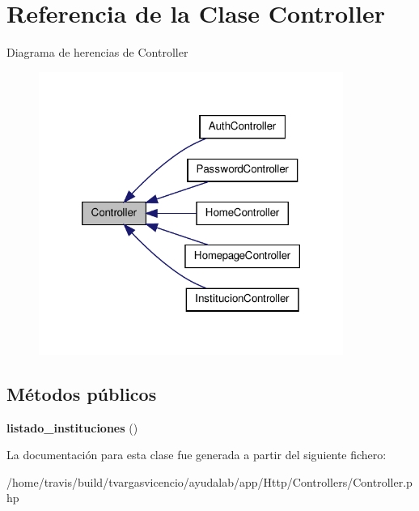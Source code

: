 \hypertarget{class_app_1_1_http_1_1_controllers_1_1_controller}{\section{\-Referencia de la \-Clase \-Controller}
\label{class_app_1_1_http_1_1_controllers_1_1_controller}
}


\-Diagrama de herencias de \-Controller
\nopagebreak
\begin{figure}[H]
\begin{center}
\leavevmode
\includegraphics[width=282pt]{class_app_1_1_http_1_1_controllers_1_1_controller__inherit__graph}
\end{center}
\end{figure}
\subsection*{\-Métodos públicos}
\begin{DoxyCompactItemize}
\item 
\hypertarget{class_app_1_1_http_1_1_controllers_1_1_controller_a7acc2cc100af57a328fbc2e4469b9d6a}{{\bfseries listado\-\_\-instituciones} ()}\label{class_app_1_1_http_1_1_controllers_1_1_controller_a7acc2cc100af57a328fbc2e4469b9d6a}

\end{DoxyCompactItemize}


\-La documentación para esta clase fue generada a partir del siguiente fichero\-:\begin{DoxyCompactItemize}
\item 
/home/travis/build/tvargasvicencio/ayudalab/app/\-Http/\-Controllers/\-Controller.\-php\end{DoxyCompactItemize}
